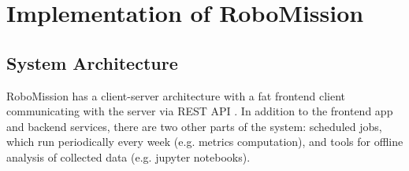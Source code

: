 \chapter{Implementation of RoboMission}
\label{chap:implementation-of-robomission}



\section{System Architecture}

RoboMission has a client-server architecture
with a fat frontend client communicating with the server via REST API
\cite{rest-api}.
In addition to the frontend app and backend services,
there are two other parts of the system:
scheduled jobs, which run periodically every week (e.g. metrics computation),
and tools for offline analysis of collected data
(e.g. jupyter notebooks). %


